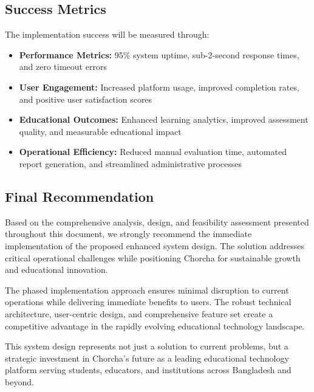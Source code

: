 \documentclass[12pt,a4paper,oneside]{book}
\begin{document}
\subsection{Success Metrics}

The implementation success will be measured through:

\begin{itemize}
    \item \textbf{Performance Metrics:} 95\% system uptime, sub-2-second response times, and zero timeout errors
    \item \textbf{User Engagement:} Increased platform usage, improved completion rates, and positive user satisfaction scores
    \item \textbf{Educational Outcomes:} Enhanced learning analytics, improved assessment quality, and measurable educational impact
    \item \textbf{Operational Efficiency:} Reduced manual evaluation time, automated report generation, and streamlined administrative processes
\end{itemize}

\subsection{Final Recommendation}

Based on the comprehensive analysis, design, and feasibility assessment presented throughout this document, we strongly recommend the immediate implementation of the proposed enhanced system design. The solution addresses critical operational challenges while positioning Chorcha for sustainable growth and educational innovation.

The phased implementation approach ensures minimal disruption to current operations while delivering immediate benefits to users. The robust technical architecture, user-centric design, and comprehensive feature set create a competitive advantage in the rapidly evolving educational technology landscape.

This system design represents not just a solution to current problems, but a strategic investment in Chorcha's future as a leading educational technology platform serving students, educators, and institutions across Bangladesh and beyond.
\end{document}
